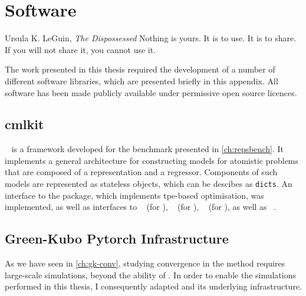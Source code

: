 
\chapter{Software}
\label{ch:software}
% 

\begin{chapquote}{Ursula K. LeGuin, \textit{The Dispossessed}}
	Nothing is yours. It is to use. It is to share.\\
	If you will not share it, you cannot use it.
\end{chapquote}

\noindent
The work presented in this thesis required the development of a number of different software libraries, which are presented briefly in this appendix. All software has been made publicly available under permissive open source licences.

\section{cmlkit}
\label{sec:si-cmlkit}

\cmlkit~\cite{cmlkit} is a framework developed for the benchmark presented in \cref{ch:repsbench}. It implements a general architecture for constructing \ml models for atomistic problems that are composed of a representation and a regressor. Components of such models are represented as stateless objects, which can be descibes as \texttt{dicts}. An interface to the  package, which implements \gls{tpe}-based \hp optimisation, was implemented, as well as interfaces to ~\cite{arunner} (for \sfs), ~\cite{aquippy} (for \soap), ~\cite{qmmlpack} (for \mbtr), as well as ~\cite{hjrf2020q}.

\section{Green-Kubo Pytorch Infrastructure}
\label{sec:si-gkinfra}

As we have seen in \cref{ch:gk-conv}, studying convergence in the \gk method requires large-scale simulations, beyond the ability of \vibes. In order to enable the simulations performed in this thesis, I consequently adapted \vibes and its underlying infrastructure.

